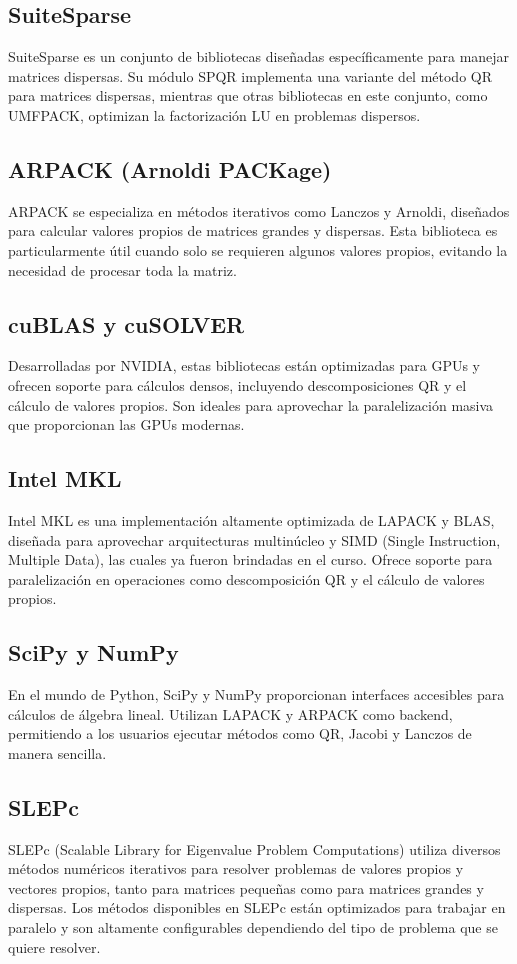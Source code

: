 \documentclass{article}
\begin{document}
\subsection{SuiteSparse}
SuiteSparse es un conjunto de bibliotecas diseñadas específicamente para manejar matrices dispersas. Su módulo SPQR implementa una variante del método QR para matrices dispersas, mientras que otras bibliotecas en este conjunto, como UMFPACK, optimizan la factorización LU en problemas dispersos.

\subsection{ARPACK (Arnoldi PACKage)}
ARPACK se especializa en métodos iterativos como Lanczos y Arnoldi, diseñados para calcular valores propios de matrices grandes y dispersas. Esta biblioteca es particularmente útil cuando solo se requieren algunos valores propios, evitando la necesidad de procesar toda la matriz.

\subsection{cuBLAS y cuSOLVER}
Desarrolladas por NVIDIA, estas bibliotecas están optimizadas para GPUs y ofrecen soporte para cálculos densos, incluyendo descomposiciones QR y el cálculo de valores propios. Son ideales para aprovechar la paralelización masiva que proporcionan las GPUs modernas.

\subsection{Intel MKL}
Intel MKL es una implementación altamente optimizada de LAPACK y BLAS, diseñada para aprovechar arquitecturas multinúcleo y SIMD (Single Instruction, Multiple Data), las cuales ya fueron brindadas en el curso.
Ofrece soporte para paralelización en operaciones como descomposición QR y el cálculo de valores propios.

\subsection{SciPy y NumPy}
En el mundo de Python, SciPy y NumPy proporcionan interfaces accesibles para cálculos de álgebra lineal. Utilizan LAPACK y ARPACK como backend, permitiendo a los usuarios ejecutar métodos como QR, Jacobi y Lanczos de manera sencilla.

\subsection{SLEPc}
SLEPc (Scalable Library for Eigenvalue Problem Computations) utiliza diversos métodos numéricos iterativos para resolver problemas de valores propios y vectores propios, tanto para matrices pequeñas como para matrices grandes y dispersas. Los métodos disponibles en SLEPc están optimizados para trabajar en paralelo y son altamente configurables dependiendo del tipo de problema que se quiere resolver.
\end{document}
